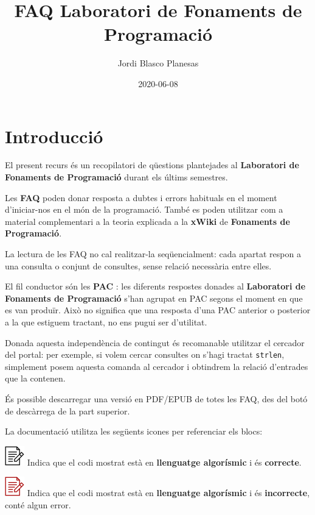 \documentclass[
]{book}
\title{FAQ Laboratori de Fonaments de Programació}
\author{Jordi Blasco Planesas}
\date{2020-06-08}
\begin{document}
\frontmatter
\maketitle

{
\setcounter{tocdepth}{1}
\tableofcontents
}
\mainmatter
\hypertarget{introducciuxf3}{%
\chapter*{Introducció}\label{introducciuxf3}}

El present recurs és un recopilatori de qüestions plantejades al \textbf{Laboratori de Fonaments de Programació} durant els últims semestres.

Les \textbf{FAQ} poden donar resposta a dubtes i errors habituals en el moment d'iniciar-nos en el món de la programació. També es poden utilitzar com a material complementari a la teoria explicada a la \textbf{xWiki} de \textbf{Fonaments de Programació}.

La lectura de les FAQ no cal realitzar-la seqüencialment: cada apartat respon a una consulta o conjunt de consultes, sense relació necessària entre elles.

El fil conductor són les \textbf{PAC} : les diferents respostes donades al \textbf{Laboratori de Fonaments de Programació} s'han agrupat en PAC segons el moment en que es van produïr. Això no significa que una resposta d'una PAC anterior o posterior a la que estiguem tractant, no ens pugui ser d'utilitat.

Donada aquesta independència de contingut és recomanable utilitzar el cercador del portal: per exemple, si volem cercar consultes on s'hagi tractat \texttt{strlen}, simplement posem aquesta comanda al cercador i obtindrem la relació d'entrades que la contenen.

És possible descarregar una versió en PDF/EPUB de totes les FAQ, des del botó de descàrrega de la part superior.

La documentació utilitza les següents icones per referenciar els blocs:

\includegraphics{./img/alg.png} Indica que el codi mostrat està en \textbf{llenguatge algorísmic} i és \textbf{correcte}.

\includegraphics{./img/alg_err.png} Indica que el codi mostrat està en \textbf{llenguatge algorísmic} i és \textbf{incorrecte}, conté algun error.
\end{document}
